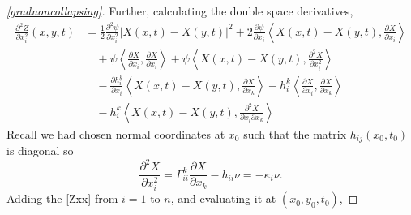 \begin{proof}[\cref{gradnoncollapsing}]
    Further, calculating the double space derivatives, \begin{align}
        \frac{\partial^{2}Z}{\partial x_{i}^{2}}(x,y,t) & = \frac{1}{2}\frac{\partial^{2} \psi}{\partial x_{i}^{2}}|X(x,t)-X(y,t)|^{2} + 2\frac{\partial \psi}{\partial x_{i}}\left< X(x,t)-X(y,t), \frac{\partial X}{\partial x_{i}} \right> \nonumber \\
        & \quad + \psi \left< \frac{\partial X}{\partial x_{i}}, \frac{\partial X}{\partial x_{i}} \right> + \psi \left< X(x,t)-X(y,t), \frac{\partial^{2} X}{\partial x_{i}^{2}} \right> \nonumber \\
        & \quad - \frac{\partial h_{i}^{k}}{\partial x_{i}}\left< X(x,t)-X(y,t), \frac{\partial X}{\partial x_{k}} \right> - h_{i}^{k}\left< \frac{\partial X}{\partial x_{i}}, \frac{\partial X}{\partial x_{k}} \right>\nonumber \\
        & \quad - h_{i}^{k}\left< X(x,t)-X(y,t), \frac{\partial^{2}X}{\partial x_{i}\partial x_{k}} \right> \label{Zxx}
    \end{align}
    Recall we had chosen normal coordinates at $ x_{0} $ such that the matrix $ h_{ij}(x_{0},t_{0}) $ is diagonal so
    \[ \frac{\partial^{2}X}{\partial x_{i}^{2}} = \Gamma_{ii}^{k}\frac{\partial X}{\partial x_{k}} -h_{ii}\nu = -\kappa_{i}\nu. \]
    Adding the \cref{Zxx} from $ i=1 $ to $ n $, and evaluating it at $ (x_{0},y_{0},t_{0}) $, 


\end{proof}
